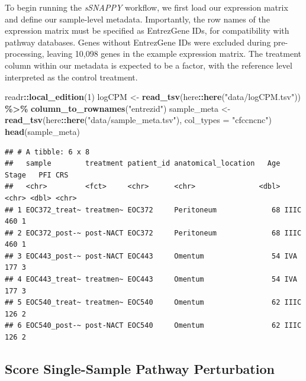\documentclass[9pt,a4paper,]{extarticle}
\newenvironment{Shaded}{\begin{snugshade}}{\end{snugshade}}
\newcommand{\AttributeTok}[1]{\textcolor[rgb]{0.13,0.29,0.53}{#1}}
\newcommand{\DecValTok}[1]{\textcolor[rgb]{0.00,0.00,0.81}{#1}}
\newcommand{\FunctionTok}[1]{\textcolor[rgb]{0.13,0.29,0.53}{\textbf{#1}}}
\newcommand{\NormalTok}[1]{#1}
\newcommand{\OtherTok}[1]{\textcolor[rgb]{0.56,0.35,0.01}{#1}}
\newcommand{\SpecialCharTok}[1]{\textcolor[rgb]{0.81,0.36,0.00}{\textbf{#1}}}
\newcommand{\StringTok}[1]{\textcolor[rgb]{0.31,0.60,0.02}{#1}}
\begin{document}
To begin running the \emph{sSNAPPY} workflow, we first load our expression matrix and define our sample-level metadata.
Importantly, the row names of the expression matrix must be specified as EntrezGene IDs, for compatibility with pathway databases.
Genes without EntrezGene IDs were excluded during pre-processing, leaving 10,098 genes in the example expression matrix.
The treatment column within our metadata is expected to be a factor, with the reference level interpreted as the control treatment.

\begin{Shaded}
\begin{Highlighting}[]
\NormalTok{readr}\SpecialCharTok{::}\FunctionTok{local\_edition}\NormalTok{(}\DecValTok{1}\NormalTok{)}
\NormalTok{logCPM }\OtherTok{\textless{}{-}} \FunctionTok{read\_tsv}\NormalTok{(here}\SpecialCharTok{::}\FunctionTok{here}\NormalTok{(}\StringTok{"data/logCPM.tsv"}\NormalTok{)) }\SpecialCharTok{\%\textgreater{}\%}
  \FunctionTok{column\_to\_rownames}\NormalTok{(}\StringTok{"entrezid"}\NormalTok{)}
\NormalTok{sample\_meta }\OtherTok{\textless{}{-}} \FunctionTok{read\_tsv}\NormalTok{(here}\SpecialCharTok{::}\FunctionTok{here}\NormalTok{(}\StringTok{"data/sample\_meta.tsv"}\NormalTok{), }\AttributeTok{col\_types =} \StringTok{"cfccncnc"}\NormalTok{)}
\FunctionTok{head}\NormalTok{(sample\_meta)}
\end{Highlighting}
\end{Shaded}

\begin{verbatim}
## # A tibble: 6 x 8
##   sample        treatment patient_id anatomical_location   Age Stage   PFI CRS  
##   <chr>         <fct>     <chr>      <chr>               <dbl> <chr> <dbl> <chr>
## 1 EOC372_treat~ treatmen~ EOC372     Peritoneum             68 IIIC    460 1    
## 2 EOC372_post-~ post-NACT EOC372     Peritoneum             68 IIIC    460 1    
## 3 EOC443_post-~ post-NACT EOC443     Omentum                54 IVA     177 3    
## 4 EOC443_treat~ treatmen~ EOC443     Omentum                54 IVA     177 3    
## 5 EOC540_treat~ treatmen~ EOC540     Omentum                62 IIIC    126 2    
## 6 EOC540_post-~ post-NACT EOC540     Omentum                62 IIIC    126 2
\end{verbatim}

\hypertarget{score-single-sample-pathway-perturbation}{%
\subsection{Score Single-Sample Pathway Perturbation}\label{score-single-sample-pathway-perturbation}}
\end{document}
